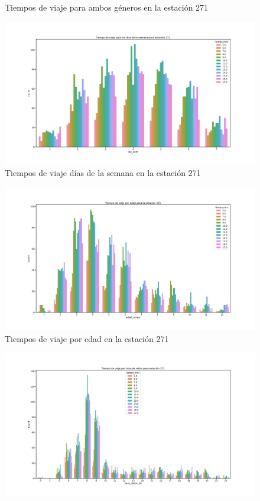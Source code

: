 \documentclass[9pt,twocolumn,twoside]{ilcss}
\begin{document}
\begin{appendices}
\begin{figure}[tbhp]
	\caption{ Tiempos de viaje para ambos géneros en la estación 271}
	\label{fig:pen_habs_penbcGenero}
\end{figure}
\begin{figure}[tbhp]
	\centering
	\includegraphics[width=0.9\linewidth]{Paper/images/tiempo_dias_semana_271.png}
	\caption{ Tiempos de viaje días de la semana en la estación 271}
	\label{fig:pen_habs_penbcDias}
\end{figure}
\begin{figure}[tbhp]
	\centering
	\includegraphics[width=0.9\linewidth]{Paper/images/tiempo_edad_271.png}
	\caption{ Tiempos de viaje por edad en la estación 271}
	\label{fig:pen_habs_penbcEdad}
\end{figure}
\begin{figure}[tbhp]
	\centering
	\includegraphics[width=0.9\linewidth]{Paper/images/tiempo_horas_271.png}

\end{figure}
\end{appendices}
\end{document}
